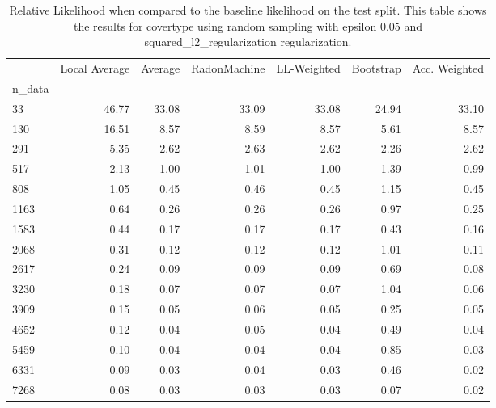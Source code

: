 \begin{table}
\centering
\caption{Relative Likelihood when compared to the baseline likelihood on the test split. This table shows the results for  covertype using  random sampling with epsilon  0.05 and  squared_l2_regularization regularization.}
\label{tab:15}
\begin{tabular}{lrrrrrr}
\toprule
{} &  Local Average &  Average &  RadonMachine &  LL-Weighted &  Bootstrap &  Acc. Weighted \\
n\_data &                &          &               &              &            &                \\
\midrule
33     &          46.77 &    33.08 &         33.09 &        33.08 &      24.94 &          33.10 \\
130    &          16.51 &     8.57 &          8.59 &         8.57 &       5.61 &           8.57 \\
291    &           5.35 &     2.62 &          2.63 &         2.62 &       2.26 &           2.62 \\
517    &           2.13 &     1.00 &          1.01 &         1.00 &       1.39 &           0.99 \\
808    &           1.05 &     0.45 &          0.46 &         0.45 &       1.15 &           0.45 \\
1163   &           0.64 &     0.26 &          0.26 &         0.26 &       0.97 &           0.25 \\
1583   &           0.44 &     0.17 &          0.17 &         0.17 &       0.43 &           0.16 \\
2068   &           0.31 &     0.12 &          0.12 &         0.12 &       1.01 &           0.11 \\
2617   &           0.24 &     0.09 &          0.09 &         0.09 &       0.69 &           0.08 \\
3230   &           0.18 &     0.07 &          0.07 &         0.07 &       1.04 &           0.06 \\
3909   &           0.15 &     0.05 &          0.06 &         0.05 &       0.25 &           0.05 \\
4652   &           0.12 &     0.04 &          0.05 &         0.04 &       0.49 &           0.04 \\
5459   &           0.10 &     0.04 &          0.04 &         0.04 &       0.85 &           0.03 \\
6331   &           0.09 &     0.03 &          0.04 &         0.03 &       0.46 &           0.02 \\
7268   &           0.08 &     0.03 &          0.03 &         0.03 &       0.07 &           0.02 \\
\bottomrule
\end{tabular}
\end{table}
